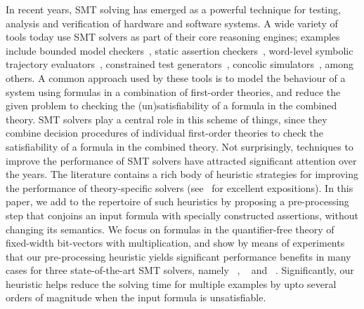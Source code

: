 %
In recent years, SMT solving has emerged as a powerful technique for
testing, analysis and verification of hardware and software systems.
A wide variety of tools today use SMT solvers as part of their core
reasoning engines; examples include bounded model
checkers~\cite{hwcbmc,boolector,ebmc,cbmc}, static assertion
checkers~\cite{corral,boogie}, word-level symbolic trajectory
evaluators~\cite{wste}, constrained test
generators~\cite{crv1,crv2,dart}, concolic simulators~\cite{concolic},
among others.  A common approach used by these tools is to model the
behaviour of a system using formulas in a combination of first-order
theories, and reduce the given problem to checking the
(un)satisfiability of a formula in the combined theory.  SMT solvers
play a central role in this scheme of things, since they combine
decision procedures of individual first-order theories to check the
satisfiability of a formula in the combined theory.  Not surprisingly,
techniques to improve the performance of SMT solvers have attracted
significant attention over the years.  The literature contains a rich
body of heuristic strategies for improving the performance of
theory-specific solvers (see~\cite{barrett,deMoura2013} for excellent
expositions).  In this paper, we add to the repertoire of such
heuristics by proposing a pre-processing step that conjoins an input
formula with specially constructed assertions, without changing its
semantics. We focus on formulas in the quantifier-free theory of
fixed-width bit-vectors with multiplication, and show by means of
experiments that our pre-processing heuristic yields significant
performance benefits in many cases for three state-of-the-art SMT
solvers, namely {\zthree}~\cite{zthree}, {\cvcfour}~\cite{cvcfour} and
{\boolector}~\cite{boolector}.  Significantly, our heuristic helps
reduce the solving time for multiple examples by upto several orders
of magnitude when the input formula is unsatisfiable.


